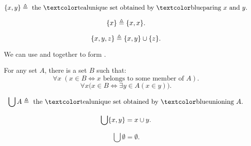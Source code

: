 \begin{frame}{}
  \begin{definition}[``$\set{x, y}$'']
    \[
      \set{x, y} \triangleq \text{ the \teal{unique} set obtained by \blue{paring} } x \text{ and } y.
    \]
  \end{definition}

  \begin{definition}[``$\set{x}$'']
    \[
      \{x\} \triangleq \{x, x\}.
    \]
  \end{definition}

  \pause
  \begin{definition}[``$\set{x, y, z}$'']
    \[
      \{x, y, z\} \triangleq \{x, y\} \cup \{z\}.
    \]
  \end{definition}

  \pause
  \begin{center}
    We can use  and  together to form .
  \end{center}
\end{frame}

\begin{frame}{}
  \begin{axiom}
    For any set $A$, there is a set $B$ such that:
    \[
      \forall x\; (x \in B \iff x \text{ belongs to some member of } A).
    \]
    \[
      \forall x \big( x \in B \iff \exists y \in A (x \in y) \big).
    \]
  \end{axiom}

  \pause
  \begin{definition}
    \[
      \bigcup A \triangleq \text{ the \teal{unique} set obtained by \blue{unioning} } A.
    \]
  \end{definition}

  \pause
  \begin{theorem}
    \[
      \bigcup \{x, y\} = x \cup y.
    \]
  \end{theorem}

  \pause
  \begin{theorem}
    \[
      \bigcup \emptyset = \emptyset.
    \]
  \end{theorem}
\end{frame}

